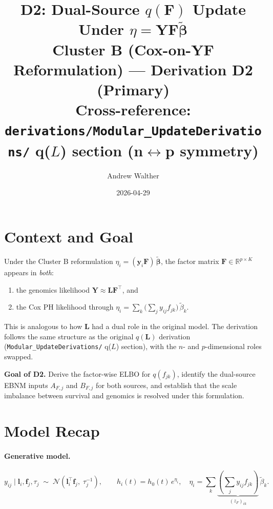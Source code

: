 \documentclass[11pt]{article}
\title{\textbf{D2: Dual-Source $q(\mathbf{F})$ Update Under $\eta = \mathbf{Y}\mathbf{F}\tilde{\boldsymbol{\beta}}$}\\[4pt]
\large Cluster B (Cox-on-YF Reformulation) — Derivation D2 (Primary)\\[2pt]
\normalsize Cross-reference: \texttt{derivations/Modular\_UpdateDerivations/} q($L$) section (n$\leftrightarrow$p symmetry)}
\author{Andrew Walther}
\date{2026-04-29}
\newcommand{\N}{\mathcal{N}}
\begin{document}
\maketitle
\tableofcontents
\newpage

\section{Context and Goal}

Under the Cluster B reformulation $\eta_i = (\mathbf{y}_i \mathbf{F})\,\tilde{\boldsymbol{\beta}}$,
the factor matrix $\mathbf{F} \in \mathbb{R}^{p \times K}$ appears in \emph{both}:
\begin{enumerate}
  \item the genomics likelihood $\mathbf{Y} \approx \mathbf{L}\mathbf{F}^\top$, and
  \item the Cox PH likelihood through $\eta_i = \sum_k \bigl(\sum_j y_{ij} f_{jk}\bigr)\,\tilde{\beta}_k$.
\end{enumerate}

This is analogous to how $\mathbf{L}$ had a dual role in the original model. The derivation
follows the same structure as the original $q(\mathbf{L})$ derivation
(\texttt{Modular\_UpdateDerivations/} q($L$) section), with the $n$- and $p$-dimensional
roles swapped.

\bigskip
\textbf{Goal of D2.} Derive the factor-wise ELBO for $q(f_{jk})$, identify the dual-source
EBNM inputs $A_{F,j}$ and $B_{F,j}$ for both sources, and establish that the scale imbalance
between survival and genomics is resolved under this formulation.

\section{Model Recap}

\paragraph{Generative model.}
\[
  y_{ij} \mid \mathbf{l}_i, \mathbf{f}_j, \tau_j
  \;\sim\; \N\!\left(\mathbf{l}_i^\top \mathbf{f}_j,\; \tau_j^{-1}\right),
  \qquad
  h_i(t) = h_0(t)\,e^{\eta_i}, \quad
  \eta_i = \sum_k \underbrace{\left(\sum_j y_{ij} f_{jk}\right)}_{(z_F)_{ik}}\,\tilde{\beta}_k.
\]
\end{document}
